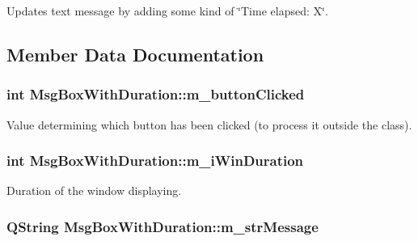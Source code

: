 Updates text message by adding some kind of \char`\"{}\-Time elapsed\-: X\char`\"{}. 



\subsection{Member Data Documentation}
\hypertarget{class_msg_box_with_duration_aa05c4b5b8f0615c52c1dee7c4d00c0ed}{
\subsubsection[{m\-\_\-button\-Clicked}]{\setlength{\rightskip}{0pt plus 5cm}int Msg\-Box\-With\-Duration\-::m\-\_\-button\-Clicked\hspace{0.3cm}{\ttfamily [private]}}}\label{class_msg_box_with_duration_aa05c4b5b8f0615c52c1dee7c4d00c0ed}


Value determining which button has been clicked (to process it outside the class). 

\hypertarget{class_msg_box_with_duration_afc0d11e89f2bd6e92b50d6ba54ffa8ae}{
\subsubsection[{m\-\_\-i\-Win\-Duration}]{\setlength{\rightskip}{0pt plus 5cm}int Msg\-Box\-With\-Duration\-::m\-\_\-i\-Win\-Duration\hspace{0.3cm}{\ttfamily [private]}}}\label{class_msg_box_with_duration_afc0d11e89f2bd6e92b50d6ba54ffa8ae}


Duration of the window displaying. 

\hypertarget{class_msg_box_with_duration_a4d3008361bc8d16dfede02d194054431}{
\subsubsection[{m\-\_\-str\-Message}]{\setlength{\rightskip}{0pt plus 5cm}Q\-String Msg\-Box\-With\-Duration\-::m\-\_\-str\-Message\hspace{0.3cm}{\ttfamily [private]}}}\label{class_msg_box_with_duration_a4d3008361bc8d16dfede02d194054431}


